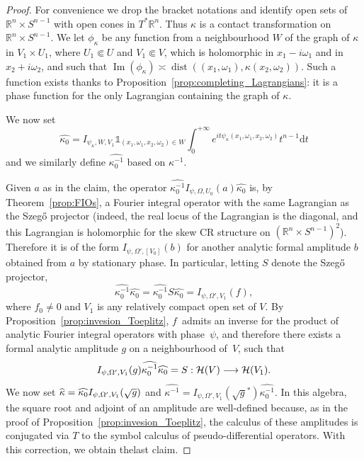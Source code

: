 \documentclass[AHL,Unicode,longabstracts,published]{cedram}
\DeclareMathOperator{\dist}{dist}
\DeclareMathOperator{\im}{Im}
\newcommand{\clH}{\mathcal{H}}
\newcommand\1{\mathds{1}}
\newcommand{\R}{\mathbb{R}}
\newcommand{\dd}{\mathrm{d}}
\let\oldhat\hat
\renewcommand*{\hat}[1]{\mathchoice{\widehat{#1}}{\widehat{#1}}{\oldhat{#1}}{\oldhat{#1}}}
\renewcommand*{\to}{\mathchoice{\longrightarrow}{\rightarrow}{\rightarrow}{\rightarrow}}
\begin{document}
\begin{proof}
For convenience we drop the bracket notations and identify open sets of $\R^n\times S^{n-1}$ with open cones in $T^*\R^n$. Thus $\kappa$ is a contact transformation on $\R^n\times S^{n-1}$. We let $\phi_{\kappa}$ be any function from a neighbourhood $W$ of the graph of $\kappa$ in $V_1\times U_1$, where $U_1\Subset U$ and $V_1\Subset V$, which is holomorphic in $x_1-i\omega_1$ and in $x_2+i\omega_2$, and such that $\im(\phi_{\kappa})\asymp
\dist((x_1,\omega_1),\kappa(x_2,\omega_2))$. Such a function exists thanks to Proposition~\ref{prop:completing_Lagrangians}: it is a phase function for the only Lagrangian containing the graph of $\kappa$.

We now set
\[
\widehat{\kappa_0}=I_{\psi_{\kappa},W,V_1}\1_{(x_1,\omega_1,x_2,\omega_2)\in W}\int_0^{+\infty}e^{it\psi_{\kappa}(x_1,\omega_1,x_2,\omega_2)}t^{n-1}\dd t
\]
and we similarly define $\widehat{\kappa_0^{-1}}$ based on $\kappa^{-1}$.

Given $a$ as in the claim, the operator $\widehat{\kappa_0^{-1}}I_{\psi,\Omega,U_0}(a)\widehat{\kappa_0}$ is, by Theorem~\ref{prop:FIOs}, a Fourier integral operator with the same Lagrangian as the Szeg\H{o} projector (indeed, the real locus of the Lagrangian is the diagonal, and this Lagrangian is holomorphic for the skew CR structure on $(\R^n\times S^{n-1})^2$). Therefore it is of the form $I_{\psi,\Omega',[V_0]}(b)$ for another analytic formal amplitude $b$ obtained from $a$ by stationary phase. In particular, letting $S$ denote the Szeg\H{o} projector,
\[
\widehat{\kappa_0^{-1}}\widehat{\kappa_0}=\widehat{\kappa_0^{-1}}S\widehat{\kappa_0}=I_{\psi,\Omega',V_1}(f),
\]
where $f_0\neq 0$ and $V_1$ is any relatively compact open set of $V$. By Proposition~\ref{prop:invesion_Toeplitz}, $f$~admits an inverse for the product of analytic Fourier {integral operators} with phase~$\psi$, and therefore there exists a formal analytic amplitude $g$ on a neighbourhood of~$V$, such that
\[
I_{\psi,\Omega',V_1}(g)\widehat{\kappa_0^{-1}}\widehat{\kappa_0}=S:\clH(V)\to
\clH(V_1).
\]
We now set $\hat{\kappa}=\widehat{\kappa_0}I_{\psi,
\Omega',V_1}(\sqrt{g})$ and $\widehat{\kappa^{-1}}=I_{\psi,\Omega',V_1}(\sqrt{g}^*)\widehat{\kappa_0^{-1}}$. In this algebra, the square root and adjoint of an amplitude are well-defined because, as in the proof of Proposition~\ref{prop:invesion_Toeplitz}, the calculus of these amplitudes is conjugated via $T$ to the symbol calculus of pseudo-differential operators. With this correction, we obtain the\linebreak last claim.


\end{proof}
\end{document}
